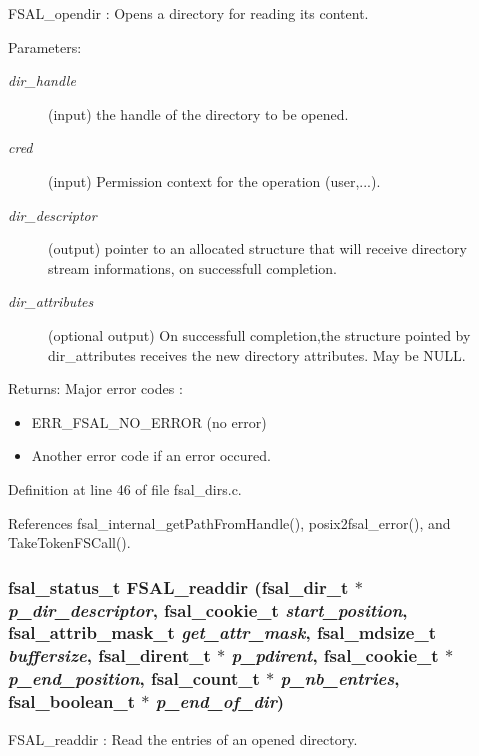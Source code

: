FSAL\_\-opendir : Opens a directory for reading its content.

\begin{Desc}
\item[Parameters:]
\begin{description}
\item[{\em dir\_\-handle}](input) the handle of the directory to be opened. \item[{\em cred}](input) Permission context for the operation (user,...). \item[{\em dir\_\-descriptor}](output) pointer to an allocated structure that will receive directory stream informations, on successfull completion. \item[{\em dir\_\-attributes}](optional output) On successfull completion,the structure pointed by dir\_\-attributes receives the new directory attributes. May be NULL.\end{description}
\end{Desc}
\begin{Desc}
\item[Returns:]Major error codes :\begin{itemize}
\item ERR\_\-FSAL\_\-NO\_\-ERROR (no error)\item Another error code if an error occured. \end{itemize}
\end{Desc}


Definition at line 46 of file fsal\_\-dirs.c.

References fsal\_\-internal\_\-get\-Path\-From\-Handle(), posix2fsal\_\-error(), and Take\-Token\-FSCall().
\subsubsection{\setlength{\rightskip}{0pt plus 5cm}fsal\_\-status\_\-t FSAL\_\-readdir (fsal\_\-dir\_\-t $\ast$ {\em p\_\-dir\_\-descriptor}, fsal\_\-cookie\_\-t {\em start\_\-position}, fsal\_\-attrib\_\-mask\_\-t {\em get\_\-attr\_\-mask}, fsal\_\-mdsize\_\-t {\em buffersize}, fsal\_\-dirent\_\-t $\ast$ {\em p\_\-pdirent}, fsal\_\-cookie\_\-t $\ast$ {\em p\_\-end\_\-position}, fsal\_\-count\_\-t $\ast$ {\em p\_\-nb\_\-entries}, fsal\_\-boolean\_\-t $\ast$ {\em p\_\-end\_\-of\_\-dir})}\label{fsal__dirs_8c_a1}


FSAL\_\-readdir : Read the entries of an opened directory.

